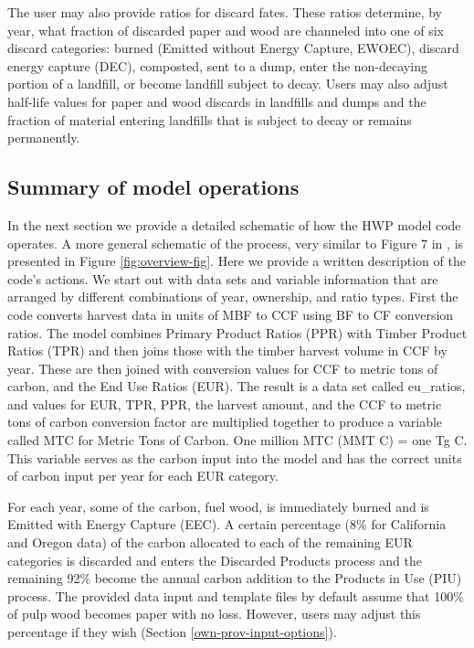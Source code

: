 \documentclass[
  openany]{book}
\begin{document}
The user may also provide ratios for discard fates. These ratios determine, by year, what fraction of discarded paper and wood are channeled into one of six discard categories: burned (Emitted without Energy Capture, EWOEC), discard energy capture (DEC), composted, sent to a dump, enter the non-decaying portion of a landfill, or become landfill subject to decay. Users may also adjust half-life values for paper and wood discards in landfills and dumps and the fraction of material entering landfills that is subject to decay or remains permanently.

\hypertarget{model-func-opp}{%
\subsection{Summary of model operations}\label{model-func-opp}}

In the next section we provide a detailed schematic of how the HWP model code operates. A more general schematic of the process, very similar to Figure 7 in \textcite{stockmann2012}, is presented in Figure \ref{fig:overview-fig}. Here we provide a written description of the code's actions. We start out with data sets and variable information that are arranged by different combinations of year, ownership, and ratio types. First the code converts harvest data in units of MBF to CCF using BF to CF conversion ratios. The model combines Primary Product Ratios (PPR) with Timber Product Ratios (TPR) and then joins those with the timber harvest volume in CCF by year. These are then joined with conversion values for CCF to metric tons of carbon, and the End Use Ratios (EUR). The result is a data set called eu\_ratios, and values for EUR, TPR, PPR, the harvest amount, and the CCF to metric tons of carbon conversion factor are multiplied together to produce a variable called MTC for Metric Tons of Carbon. One million MTC (MMT C) = one Tg C. This variable serves as the carbon input into the model and has the correct units of carbon input per year for each EUR category.

For each year, some of the carbon, fuel wood, is immediately burned and is Emitted with Energy Capture (EEC). A certain percentage (8\% for California and Oregon data) of the carbon allocated to each of the remaining EUR categories is discarded and enters the Discarded Products process and the remaining 92\% become the annual carbon addition to the Products in Use (PIU) process. The provided data input and template files by default assume that 100\% of pulp wood becomes paper with no loss. However, users may adjust this percentage if they wish (Section \ref{own-prov-input-options}).
\end{document}

